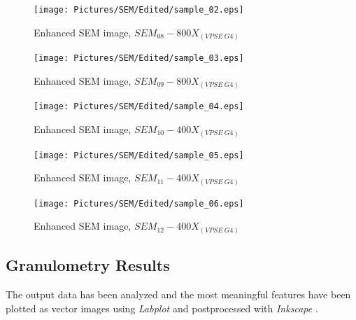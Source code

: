 \documentclass{article}
\begin{document}
          \begin{figure}[h!]
              \centering 
              \texttt{[image: Pictures/SEM/Edited/sample\_02.eps]}
              \caption{Enhanced SEM image, $SEM_{08}-800X_{(VPSE \ G4)}$ \autocites{Pixelmator_Pro}{GIMP}}
              \label{fig:SEM_08}
          \end{figure}
      
          \begin{figure}[h!]
              \centering 
              \texttt{[image: Pictures/SEM/Edited/sample\_03.eps]}
              \caption{Enhanced SEM image, $SEM_{09}-800X_{(VPSE \ G4)}$ \autocites{Pixelmator_Pro}{GIMP}}
              \label{fig:SEM_09}
          \end{figure}

          \begin{figure}[h!]
              \centering 
              \texttt{[image: Pictures/SEM/Edited/sample\_04.eps]}
              \caption{Enhanced SEM image, $SEM_{10}-400X_{(VPSE \ G4)}$ \autocites{Pixelmator_Pro}{GIMP}}
              \label{fig:SEM_10}
          \end{figure}

          \begin{figure}[h!]
              \centering 
              \texttt{[image: Pictures/SEM/Edited/sample\_05.eps]}
              \caption{Enhanced SEM image, $SEM_{11}-400X_{(VPSE \ G4)}$ \autocites{Pixelmator_Pro}{GIMP}}
              \label{fig:SEM_11}
          \end{figure}

          \begin{figure}[h!]
              \centering 
              \texttt{[image: Pictures/SEM/Edited/sample\_06.eps]}
              \caption{Enhanced SEM image, $SEM_{12}-400X_{(VPSE \ G4)}$ \autocites{Pixelmator_Pro}{GIMP}}
              \label{fig:SEM_12}
          \end{figure}

    \clearpage

    \subsection{Granulometry Results\label{Granulometry_results}}
      
      The output data has been analyzed and the most meaningful features have been plotted as vector images using \textit{Labplot} \autocites{Labplot} and 
      postprocessed with \textit{Inkscape} \autocites{Inkscape}. \\ 
  
\end{document}
